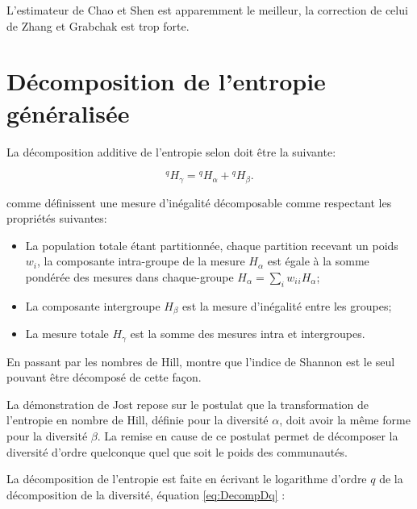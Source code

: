 \documentclass[
  11pt,
  french,
  a4paper,
  extrafontsizes,onecolumn,openright
  ]{memoir}
\providecommand{\tightlist}{%
  \setlength{\itemsep}{0pt}\setlength{\parskip}{0pt}}
\begin{document}
\normalsize

L'estimateur de Chao et Shen est apparemment le meilleur, la correction de celui de Zhang et Grabchak est trop forte.

\hypertarget{duxe9composition-de-lentropie-guxe9nuxe9ralisuxe9e}{%
\section{Décomposition de l'entropie généralisée}\label{duxe9composition-de-lentropie-guxe9nuxe9ralisuxe9e}}

La décomposition additive de l'entropie selon \textcite{Lande1996} doit être la suivante:

\begin{equation}
  \label{eq:DecompHq}
  ^{q}\!H_{\gamma} = {^{q}\!H_{\alpha}} + {^{q}\!H_{\beta}}.
\end{equation}

\textcite{Bourguignon1979} comme \textcite{Lande1996} définissent une mesure d'inégalité décomposable comme respectant les propriétés suivantes:

\begin{itemize}
\tightlist
\item
  La population totale étant partitionnée, chaque partition recevant un poids \(w_i\), la composante intra-groupe de la mesure \(H_{\alpha}\) est égale à la somme pondérée des mesures dans chaque-groupe \(H_{\alpha}=\sum_i{w_i {_{i}\!H_{\alpha}}}\);
\item
  La composante intergroupe \(H_{\beta}\) est la mesure d'inégalité entre les groupes;
\item
  La mesure totale \(H_{\gamma}\) est la somme des mesures intra et intergroupes.
\end{itemize}

En passant par les nombres de Hill, \textcite{Jost2007} montre que l'indice de Shannon est le seul pouvant être décomposé de cette façon.

La démonstration de Jost repose sur le postulat que la transformation de l'entropie en nombre de Hill, définie pour la diversité \(\alpha\), doit avoir la même forme pour la diversité \(\beta\).
La remise en cause de ce postulat \autocite{Marcon2014a} permet de décomposer la diversité d'ordre quelconque quel que soit le poids des communautés.

La décomposition de l'entropie est faite en écrivant le logarithme d'ordre \(q\) de la décomposition de la diversité, équation \eqref{eq:DecompDq} :
\end{document}
